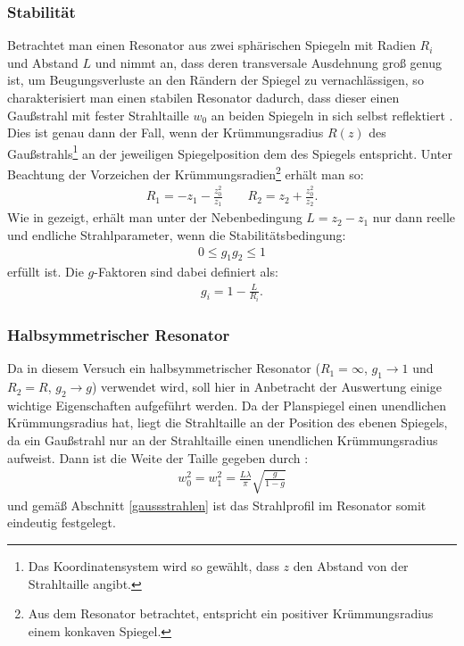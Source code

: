 \documentclass[11pt, a4paper]{article}
\numberwithin{equation}{section}
\begin{document}
\subsubsection{Stabilität}
Betrachtet man einen Resonator aus zwei sphärischen Spiegeln mit Radien $R_i$ und Abstand $L$ und nimmt an, dass deren transversale Ausdehnung groß genug ist, um Beugungsverluste an den Rändern der Spiegel zu vernachlässigen, so charakterisiert man einen stabilen Resonator dadurch, dass dieser einen Gaußstrahl mit fester Strahltaille $w_0$ an beiden Spiegeln in sich selbst reflektiert \cite{siegman}.
Dies ist genau dann der Fall, wenn der Krümmungsradius $R(z)$ des Gaußstrahls\footnote{Das Koordinatensystem wird so gewählt, dass $z$ den Abstand von der Strahltaille angibt.} an der jeweiligen Spiegelposition dem des Spiegels entspricht.
Unter Beachtung der Vorzeichen der Krümmungsradien\footnote{Aus dem Resonator betrachtet, entspricht ein positiver Krümmungsradius einem konkaven Spiegel.} erhält man so:
\begin{align}
	R_1 = - z_1 - \frac{z_0^2}{z_1}  \qquad
	R_2 = z_2 + \frac{z_0^2}{z_2} \text{.}
\end{align}
Wie in \cite{siegman} gezeigt, erhält man unter der Nebenbedingung $L = z_2 - z_1$ nur dann reelle und endliche Strahlparameter, wenn die Stabilitätsbedingung:
\begin{align}
	0 \le g_1 g_2 \le 1
\end{align}
erfüllt ist.
Die $g$-Faktoren sind dabei definiert als:
\begin{align}
	g_i = 1 - \frac{L}{R_i} \text{.}
\end{align}

\subsubsection{Halbsymmetrischer Resonator}
Da in diesem Versuch ein halbsymmetrischer Resonator ($R_1 = \infty$, $g_1 \rightarrow 1$ und $R_2 = R$, $g_2 \rightarrow g$) verwendet wird, soll hier in Anbetracht der Auswertung einige wichtige Eigenschaften aufgeführt werden.
Da der Planspiegel einen unendlichen Krümmungsradius hat, liegt die Strahltaille an der Position des ebenen Spiegels, da ein Gaußstrahl nur an der Strahltaille einen unendlichen Krümmungsradius aufweist.
Dann ist die Weite der Taille gegeben durch \cite{siegman}:
\begin{align}
	w_0^2 = w_1^2 = \frac{L \lambda}{\pi} \sqrt{\frac{g}{1 - g}}
	\label{eq:strahltaille_halbsym}
\end{align}
und gemäß Abschnitt \ref{gaussstrahlen} ist das Strahlprofil im Resonator somit eindeutig festgelegt.
\end{document}
